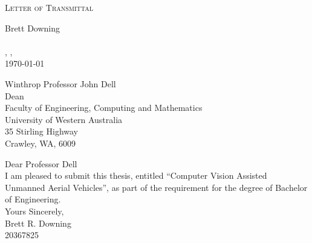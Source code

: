 

\begin{titlepage}
\begin{center}

\textsc{Letter of Transmittal}\\[0.5cm]


\noindent
\begin{minipage}[t]{0.4\textwidth}
\begin{flushleft} \large
\end{flushleft}
\end{minipage}%
\begin{minipage}[t]{0.3\textwidth}
\begin{flushright} \large
Brett Downing\\
\addressfirst\\
\addresssecond, \addressstate, \addresscode\\
{\today}
\end{flushright}
\end{minipage}

\noindent
\begin{minipage}[t]{0.8\textwidth}
\begin{flushleft} \large
Winthrop Professor John Dell\\
Dean\\
Faculty of Engineering, Computing and Mathematics\\
University of Western Australia\\
35 Stirling Highway\\
Crawley, WA, 6009\\

\vspace{30mm}

Dear Professor Dell\\
I am pleased to submit this thesis, entitled ``Computer Vision Assisted Unmanned Aerial Vehicles'', as part of the requirement for the degree of Bachelor of Engineering.\\
Yours Sincerely,\\
\vspace{30mm}
Brett R. Downing\\
20367825
\end{flushleft}
\end{minipage}
\begin{minipage}[t]{0.4\textwidth}
\begin{flushright} \large
\end{flushright}
\end{minipage}%

\end{center}
\end{titlepage}